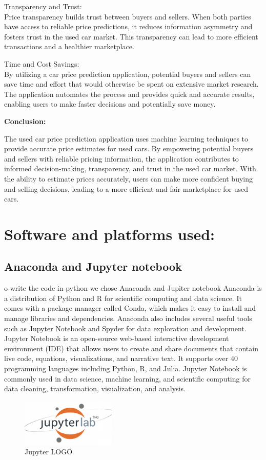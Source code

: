 \documentclass{article}
\begin{document}
\begin{flushleft}
\item [\ding{90}]Transparency and Trust: \\
Price transparency builds trust between buyers and sellers. When both parties have access to reliable price predictions, it reduces information asymmetry and fosters trust in the used car market. This transparency can lead to more efficient transactions and a healthier marketplace.

\item [\ding{90}]Time and Cost Savings: \\
By utilizing a car price prediction application, potential buyers and sellers can save time and effort that would otherwise be spent on extensive market research. The application automates the process and provides quick and accurate results, enabling users to make faster decisions and potentially save money.

\textbf{Conclusion:}

The used car price prediction application uses machine learning techniques to provide accurate price estimates for used cars. By empowering potential buyers and sellers with reliable pricing information, the application contributes to informed decision-making, transparency, and trust in the used car market. With the ability to estimate prices accurately, users can make more confident buying and selling decisions, leading to a more efficient and fair marketplace for used cars.
\newpage
\end{flushleft}

\section{Software and platforms used:}
\subsection{Anaconda and Jupyter notebook}
o write the code in python we chose Anaconda and Jupiter notebook Anaconda is a distribution of Python and R for scientific computing and data science. It comes with a package
manager called Conda, which makes it easy to install and manage libraries and dependencies.
Anaconda also includes several useful tools such as Jupyter Notebook and Spyder for data
exploration and development. Jupyter Notebook is an open-source web-based interactive development environment (IDE) that allows users to create and share documents that contain
live code, equations, visualizations, and narrative text. It supports over 40 programming languages including Python, R, and Julia. Jupyter Notebook is commonly used in data science,
machine learning, and scientific computing for data cleaning, transformation, visualization,
and analysis.
\begin{figure}[!h]
    \centering
    \includegraphics[width=0.4\textwidth]{jupyter.png}
    \caption{Jupyter LOGO}
    \label{fig:my_label}
\end{figure}
\end{document}
